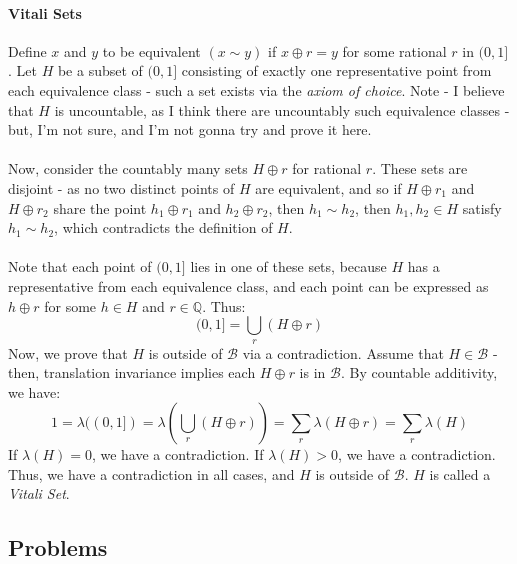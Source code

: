 \documentclass[12pt,a4paper]{article}
\newcommand{\1}[1]{\mathbbm{1}\left\{ #1 \right\}}
\newcommand{\Q}{\mathbb{Q}}
\newcommand{\bcal}{\mathcal{B}}
\begin{document}
\paragraph{Vitali Sets} Define $x$ and $y$ to be equivalent $(x \sim y)$ if $x \oplus r = y$ for some rational $r$ in $(0,1]$. Let $H$ be a subset of $(0,1]$ consisting of exactly one representative point from each equivalence class - such a set exists via the \textit{axiom of choice}. Note - I believe that $H$ is uncountable, as I think there are uncountably such equivalence classes - but, I'm not sure, and I'm not gonna try and prove it here.
\\\\
Now, consider the countably many sets $H \oplus r$ for rational $r$. These sets are disjoint - as no two distinct points of $H$ are equivalent, and so if $H \oplus r_1$ and $H \oplus r_2$ share the point $h_1 \oplus r_1$ and $h_2 \oplus r_2$, then $h_1 \sim h_2$, then $h_1,h_2 \in H$ satisfy $h_1 \sim h_2$, which contradicts the definition of $H$.
\\\\
Note that each point of $(0,1]$ lies in one of these sets, because $H$ has a representative from each equivalence class, and each point can be expressed as $h \oplus r$ for some $h \in H$ and $r \in \Q$. Thus:
$$
	(0,1] = \bigcup_r (H \oplus r)
$$
Now, we prove that $H$ is outside of $\bcal$ via a contradiction. Assume that $H \in \bcal$ - then, translation invariance implies each $H \oplus r$ is in $\bcal$. By countable additivity, we have:
$$
	1 = \lambda((0,1]) = \lambda\left(\bigcup_r (H \oplus r)\right) = \sum_r \lambda(H \oplus r) =
	\sum_r \lambda(H)
$$
If $\lambda(H) = 0$, we have a contradiction. If $\lambda(H) > 0$, we have a contradiction. Thus, we have a contradiction in all cases, and $H$ is outside of $\bcal$. $H$ is called a \textit{Vitali Set}.

\subsection{Problems}
\end{document}
